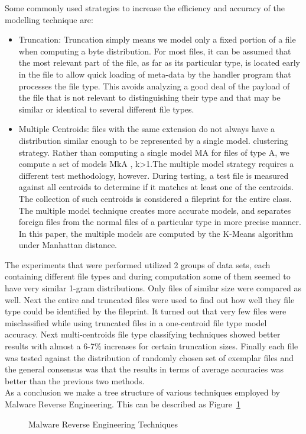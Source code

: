\documentclass[11pt]{article}
\begin{document}
		Some commonly used strategies to increase the efficiency and accuracy of the modelling technique are:
		\begin{itemize}
			\item Truncation: Truncation simply means we model only a fixed portion of a file when computing a byte distribution. For most files, it can be assumed that the most relevant part of the file, as far as its particular type, is located early in the file to allow quick loading of meta-data by the handler program that processes the file type. This avoids analyzing a good deal of the payload of the file that is not relevant to distinguishing their type and that may be similar or identical to several different file types.
			\item Multiple Centroids: files with the same extension do not always have a distribution similar enough to be represented by a single model. clustering strategy. Rather than computing a single model MA for files of type A, we compute a set of models MkA , k>1.The multiple model strategy requires a different test methodology, however. During testing, a test file is measured against all centroids to determine if it matches at least one of the centroids. The collection of such centroids is considered a fileprint for the entire class. The multiple model technique creates more accurate models, and separates foreign files from the normal files of a particular type in more precise manner. In this paper, the multiple models are computed by the K-Means algorithm under Manhattan distance.
		\end{itemize}
		The experiments that were performed utilized 2 groups of data sets, each containing different file types and during computation some of them seemed to have very similar 1-gram distributions. Only files of similar size were compared as well. Next the entire and truncated files were used to find out how well they file type could be identified by the fileprint. It turned out that very few files were misclassified while using truncated files in a one-centroid file type model accuracy. Next multi-centroids file type classifying techniques showed better results with almost a 6-7\% increases for certain truncation sizes. Finally each file was tested against the distribution of randomly chosen set of exemplar files and the general consensus was that the results in terms of average accuracies was better than the previous two methods.\\
		As a conclusion we make a tree structure of various techniques employed by Malware Reverse Engineering. This can be described as Figure~\ref{Reverse}\\
		\begin{figure}[t]
			\centering
			\caption{Malware Reverse Engineering Techniques}\label{Reverse}
		\end{figure}
\end{document}
